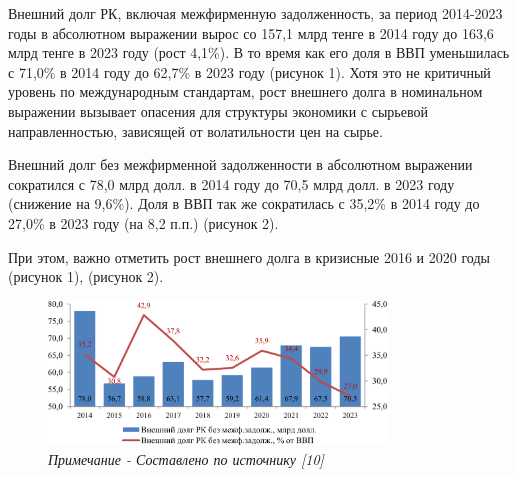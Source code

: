 \begin{multicols}{2}
Внешний долг РК, включая межфирменную задолженность, за период 2014-2023
годы в абсолютном выражении вырос со 157,1 млрд тенге в 2014 году до
163,6 млрд тенге в 2023 году (рост 4,1\%). В то время как его доля в ВВП
уменьшилась с 71,0\% в 2014 году до 62,7\% в 2023 году (рисунок 1). Хотя
это не критичный уровень по международным стандартам, рост внешнего
долга в номинальном выражении вызывает опасения для структуры экономики
с сырьевой направленностью, зависящей от волатильности цен на сырье.

Внешний долг без межфирменной задолженности в абсолютном выражении
сократился с 78,0 млрд долл. в 2014 году до 70,5 млрд долл. в 2023 году
(снижение на 9,6\%). Доля в ВВП так же сократилась с 35,2\% в 2014 году
до 27,0\% в 2023 году (на 8,2 п.п.) (рисунок 2).

При этом, важно отметить рост внешнего долга в кризисные 2016 и 2020
годы (рисунок 1), (рисунок 2).
\end{multicols}

\begin{figure}[H]
	\centering
	\includegraphics[width=0.8\textwidth]{media/ekon4/image13}
	\caption*{Рис.2 - Внешний долг РК, исключая межфирменную задолженность, в 2014-2023 годы, млрд долл. США / \% от ВВП}
	\caption*{\normalfont\emph{Примечание - Составлено по источнику {[}10{]}}}
\end{figure}

